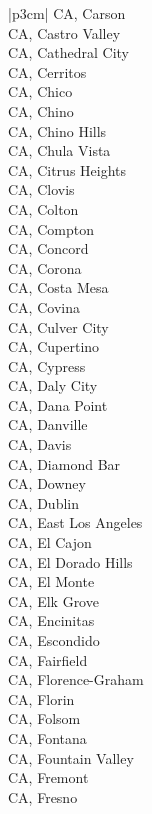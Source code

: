 \begin{customLongTable}{ |p{3cm}| }
CA, Carson \\ \hline
CA, Castro Valley \\ \hline
CA, Cathedral City \\ \hline
CA, Cerritos \\ \hline
CA, Chico \\ \hline
CA, Chino \\ \hline
CA, Chino Hills \\ \hline
CA, Chula Vista \\ \hline
CA, Citrus Heights \\ \hline
CA, Clovis \\ \hline
CA, Colton \\ \hline
CA, Compton \\ \hline
CA, Concord \\ \hline
CA, Corona \\ \hline
CA, Costa Mesa \\ \hline
CA, Covina \\ \hline
CA, Culver City \\ \hline
CA, Cupertino \\ \hline
CA, Cypress \\ \hline
CA, Daly City \\ \hline
CA, Dana Point \\ \hline
CA, Danville \\ \hline
CA, Davis \\ \hline
CA, Diamond Bar \\ \hline
CA, Downey \\ \hline
CA, Dublin \\ \hline
CA, East Los Angeles \\ \hline
CA, El Cajon \\ \hline
CA, El Dorado Hills \\ \hline
CA, El Monte \\ \hline
CA, Elk Grove \\ \hline
CA, Encinitas \\ \hline
CA, Escondido \\ \hline
CA, Fairfield \\ \hline
CA, Florence-Graham \\ \hline
CA, Florin \\ \hline
CA, Folsom \\ \hline
CA, Fontana \\ \hline
CA, Fountain Valley \\ \hline
CA, Fremont \\ \hline
CA, Fresno \\ \hline

\end{customLongTable}
